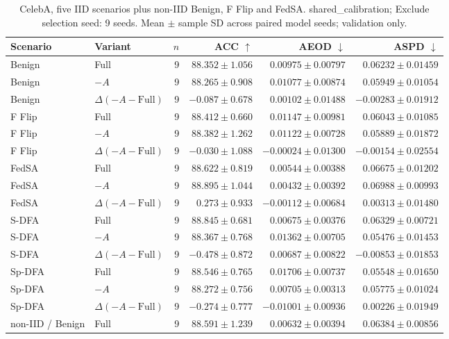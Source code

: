 \begin{table}[t]
\centering
\small
\caption{CelebA, five IID scenarios plus non-IID Benign, F Flip and FedSA. shared\_calibration; Exclude selection seed: 9 seeds. Mean $\pm$ sample SD across paired model seeds; validation only.}
\begin{tabular}{llrrrr}
\toprule
Scenario & Variant & $n$ & ACC $\uparrow$ & AEOD $\downarrow$ & ASPD $\downarrow$ \\
\midrule
Benign & Full & 9 & $88.352 \pm 1.056$ & $0.00975 \pm 0.00797$ & $0.06232 \pm 0.01459$ \\
Benign & $-A$ & 9 & $88.265 \pm 0.908$ & $0.01077 \pm 0.00874$ & $0.05949 \pm 0.01054$ \\
Benign & $\Delta(-A-\mathrm{Full})$ & 9 & $-0.087 \pm 0.678$ & $0.00102 \pm 0.01488$ & $-0.00283 \pm 0.01912$ \\
F Flip & Full & 9 & $88.412 \pm 0.660$ & $0.01147 \pm 0.00981$ & $0.06043 \pm 0.01085$ \\
F Flip & $-A$ & 9 & $88.382 \pm 1.262$ & $0.01122 \pm 0.00728$ & $0.05889 \pm 0.01872$ \\
F Flip & $\Delta(-A-\mathrm{Full})$ & 9 & $-0.030 \pm 1.088$ & $-0.00024 \pm 0.01300$ & $-0.00154 \pm 0.02554$ \\
FedSA & Full & 9 & $88.622 \pm 0.819$ & $0.00544 \pm 0.00388$ & $0.06675 \pm 0.01202$ \\
FedSA & $-A$ & 9 & $88.895 \pm 1.044$ & $0.00432 \pm 0.00392$ & $0.06988 \pm 0.00993$ \\
FedSA & $\Delta(-A-\mathrm{Full})$ & 9 & $0.273 \pm 0.933$ & $-0.00112 \pm 0.00684$ & $0.00313 \pm 0.01480$ \\
S-DFA & Full & 9 & $88.845 \pm 0.681$ & $0.00675 \pm 0.00376$ & $0.06329 \pm 0.00721$ \\
S-DFA & $-A$ & 9 & $88.367 \pm 0.768$ & $0.01362 \pm 0.00705$ & $0.05476 \pm 0.01453$ \\
S-DFA & $\Delta(-A-\mathrm{Full})$ & 9 & $-0.478 \pm 0.872$ & $0.00687 \pm 0.00822$ & $-0.00853 \pm 0.01853$ \\
Sp-DFA & Full & 9 & $88.546 \pm 0.765$ & $0.01706 \pm 0.00737$ & $0.05548 \pm 0.01650$ \\
Sp-DFA & $-A$ & 9 & $88.272 \pm 0.756$ & $0.00705 \pm 0.00313$ & $0.05775 \pm 0.01024$ \\
Sp-DFA & $\Delta(-A-\mathrm{Full})$ & 9 & $-0.274 \pm 0.777$ & $-0.01001 \pm 0.00936$ & $0.00226 \pm 0.01949$ \\
non-IID / Benign & Full & 9 & $88.591 \pm 1.239$ & $0.00632 \pm 0.00394$ & $0.06384 \pm 0.00856$ \\

\end{tabular}
\end{table}
